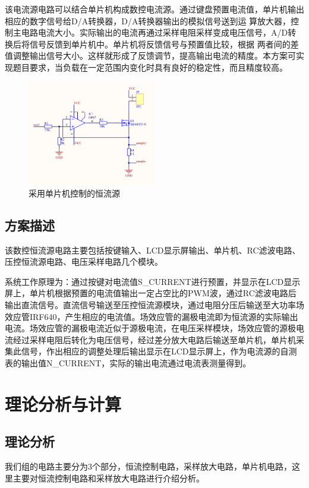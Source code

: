 \documentclass{../source/zjureport}
\begin{document}
    
            该电流源电路可以结合单片机构成数控电流源。通过键盘预置电流值，单片机输出相应的数字信号给D/A转换器，D/A转换器输出的模拟信号送到运 算放大器，控制主电路电流大小。实际输出的电流再通过采样电阻采样变成电压信号，A/D转换后将信号反馈到单片机中。单片机将反馈信号与预置值比较，根据 两者间的差值调整输出信号大小。这样就形成了反馈调节，提高输出电流的精度。本方案可实现题目要求，当负载在一定范围内变化时具有良好的稳定性，而且精度较高。
            \begin{figure}[thp]
                \centering
                \includegraphics[width = 0.5\textwidth]{figure/采用单片机控制的恒流源.png}
                \caption{采用单片机控制的恒流源}
            \end{figure}

        \subsection{方案描述}

        该数控恒流源电路主要包括按键输入、LCD显示屏输出、单片机、RC滤波电路、压控恒流源电路、电压采样电路几个模块。

        系统工作原理为：通过按键对电流值S_CURRENT进行预置，并显示在LCD显示屏上，单片机根据预置的电流值输出一定占空比的PWM波，通过RC滤波电路后输出直流信号。直流信号输送至压控恒流源模块，通过电阻分压后输送至大功率场效应管IRF640，产生相应的电流值。场效应管的漏极电流即为恒流源的实际输出电流。场效应管的漏极电流近似于源极电流，在电压采样模块，场效应管的源极电流经过采样电阻后转化为电压信号，经过差分放大电路后输送至单片机，单片机采集此信号，作出相应的调整处理后输出显示在LCD显示屏上，作为电流源的自测表的输出值N_CURRENT，实际的输出电流通过电流表测量得到。

    \section{理论分析与计算}
        \subsection{理论分析}
        我们组的电路主要分为3个部分，恒流控制电路，采样放大电路，单片机电路，这里主要对恒流控制电路和采样放大电路进行介绍分析。
\end{document}
